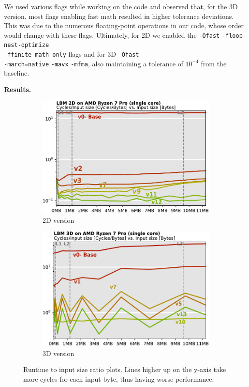 \documentclass[letterpaper]{article}
\newcommand{\mypar}[1]{{\bf #1.}}
\begin{document}
We used various flags while working on the code and observed that, for the 3D version, most flags enabling fast math resulted in higher tolerance deviations. This was due to the numerous floating-point operations in our code, whose order would change with these flags. Ultimately, for 2D we enabled the \texttt{-Ofast} \texttt{-floop-nest-optimize} \\\texttt{-ffinite-math-only} flags and for 3D \texttt{-Ofast}  \\\texttt{-march=native}  \texttt{-mavx}  \texttt{-mfma}, also maintaining a tolerance of $10^{-4}$ from the baseline.


\mypar{Results}
\begin{figure}[h!]
\begin{subfigure}[t]{\linewidth}
    \includegraphics[width=\linewidth]{fig/2D_artifacts/sizevscycles_report.out.pdf}
    \caption{2D version}
\end{subfigure}
\begin{subfigure}[t]{\linewidth}
    \includegraphics[width=\linewidth]{fig/3D_artifacts/sizevscycles_report.out.pdf}
    \caption{3D version}
\end{subfigure}
    \caption{Runtime to input size ratio plots. Lines higher up on the y-axis take more cycles for each input byte, thus having worse performance.}
\label{fig:sizevcycle}
\end{figure}
\end{document}
